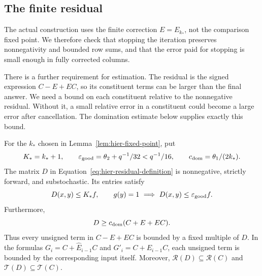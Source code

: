 \subsection{The finite residual}

The actual construction uses the finite correction $E=E_{k_*}$, not the comparison fixed point. We therefore check that stopping the iteration preserves nonnegativity and bounded row sums, and that the error paid for stopping is small enough in fully corrected columns.

There is a further requirement for estimation. The residual is the signed expression $C-E+EC$, so its constituent terms can be larger than the final answer. We need a bound on each constituent relative to the nonnegative residual. Without it, a small relative error in a constituent could become a large error after cancellation. The domination estimate below supplies exactly this bound.

\begin{lemma}
\label{lem:hier-residual}
For the $k_*$ chosen in Lemma~\ref{lem:hier-fixed-point}, put
\[
 K_*=k_*+1,\qquad
 \varepsilon_{\rm good}=\theta_2+q^{-1}/32<q^{-1}/16,
 \qquad c_{\rm dom}=\theta_1/(2k_*).
\]
The matrix $D$ in Equation~\eqref{eq:hier-residual-definition} is
nonnegative, strictly forward, and substochastic.  Its entries satisfy
\begin{equation}
 D(x,y)\leq K_*f,
 \qquad
 g(y)=1\ \Longrightarrow\ D(x,y)\leq\varepsilon_{\rm good}f.
 \label{eq:hier-residual-entry-bounds}
\end{equation}
Furthermore,
\begin{equation}
 D\geq c_{\rm dom}(C+E+EC).
 \label{eq:hier-domination}
\end{equation}
Thus every unsigned term in $C-E+EC$ is bounded by a fixed multiple
of $D$.  In the formulas $G_i=C+\widehat E_{i-1}C$ and
$G'_i=C+E_{i-1}C$, each unsigned term is bounded by the corresponding
input itself.  Moreover,
$\mathcal R(D)\subseteq\mathcal R(C)$ and
$\mathcal T(D)\subseteq\mathcal T(C)$.
\end{lemma}

